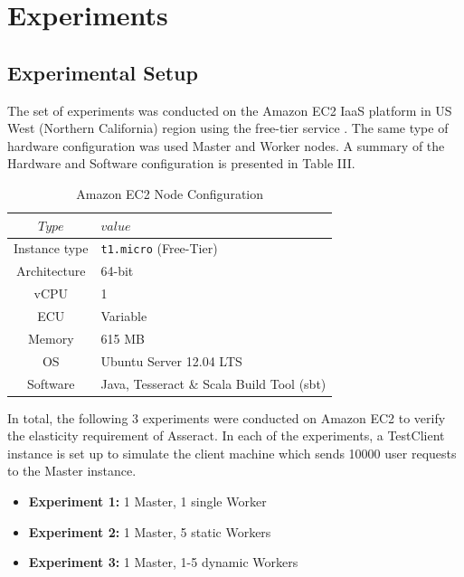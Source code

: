 \documentclass[conference]{IEEEtran}
\begin{document}
\section{Experiments}\label{sec:experiment}

\subsection{Experimental Setup}\label{sec:experimentsetup}
The set of experiments was conducted on the Amazon EC2 IaaS platform in US West (Northern California) region using the free-tier service \cite{ec2node}. The same type of hardware configuration was used Master and Worker nodes. A summary of the Hardware and Software configuration is presented in Table III.

\begin{table}[H]
\renewcommand{\arraystretch}{1.3}
\caption{Amazon EC2 Node Configuration}\label{tab:ec2node}
\centering
\begin{tabular*}{8cm}{c|p{5cm}}
    \hline
    $Type$&$value$\\
    \hline
    Instance type & \texttt{t1.micro} (Free-Tier) \\
    Architecture & 64-bit \\
    vCPU & 1 \\
    ECU & Variable \\
    Memory & 615 MB \\
    OS & Ubuntu Server 12.04 LTS \\
    Software & Java, Tesseract \& Scala Build Tool (sbt) \\
    \hline
\end{tabular*}
\end{table}

In total, the following 3 experiments were conducted on Amazon EC2 to verify the elasticity requirement of Asseract. In each of the experiments, a TestClient instance is set up to simulate the client machine which sends 10000 user requests to the Master instance.


\begin{itemize}
  \item \textbf{Experiment 1:} 1 Master, 1 single Worker
  \item \textbf{Experiment 2:} 1 Master, 5 static Workers
  \item \textbf{Experiment 3:} 1 Master, 1-5 dynamic Workers \\
\end{itemize} 
\end{document}
